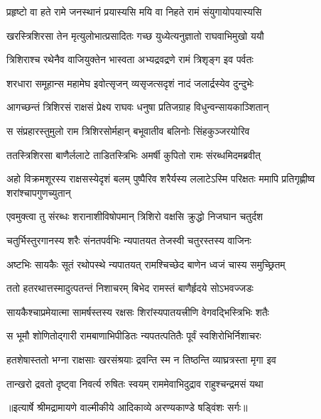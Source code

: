 \twolineshloka
{प्रहृष्टो वा हते रामे जनस्थानं प्रयास्यसि}
{मयि वा निहते रामं संयुगायोपयास्यसि} %

\twolineshloka
{खरस्त्रिशिरसा तेन मृत्युलोभात्प्रसादितः}
{गच्छ युध्येत्यनुज्ञातो राघवाभिमुखो ययौ} %

\twolineshloka
{त्रिशिराश्च रथेनैव वाजियुक्तेन भास्वता}
{अभ्यद्रवद्रणे रामं त्रिशृङ्ग इव पर्वतः} %

\twolineshloka
{शरधारा समूहान्स महामेघ इवोत्सृजन्}
{व्यसृजत्सदृशं नादं जलार्द्रस्येव दुन्दुभेः} %

\twolineshloka
{आगच्छन्तं त्रिशिरसं राक्षसं प्रेक्ष्य राघवः}
{धनुषा प्रतिजग्राह विधुन्वन्सायकाञ्शितान्} %

\twolineshloka
{स संप्रहारस्तुमुलो राम त्रिशिरसोर्महान्}
{बभूवातीव बलिनोः सिंहकुञ्जरयोरिव} %

\twolineshloka
{ततस्त्रिशिरसा बाणैर्ललाटे ताडितस्त्रिभिः}
{अमर्षी कुपितो रामः संरब्धमिदमब्रवीत्} %

\threelineshloka
{अहो विक्रमशूरस्य राक्षसस्येदृशं बलम्}
{पुष्पैरिव शरैर्यस्य ललाटेऽस्मि परिक्षतः}
{ममापि प्रतिगृह्णीष्व शरांश्चापगुणच्युतान्} %

\twolineshloka
{एवमुक्त्वा तु संरब्धः शरानाशीविषोपमान्}
{त्रिशिरो वक्षसि क्रुद्धो निजघान चतुर्दश} %

\twolineshloka
{चतुर्भिस्तुरगानस्य शरैः संनतपर्वभिः}
{न्यपातयत तेजस्वी चतुरस्तस्य वाजिनः} %

\twolineshloka
{अष्टभिः सायकैः सूतं रथोपस्थे न्यपातयत्}
{रामश्चिच्छेद बाणेन ध्वजं चास्य समुच्छ्रितम्} %

\twolineshloka
{ततो हतरथात्तस्मादुत्पतन्तं निशाचरम्}
{बिभेद रामस्तं बाणैर्हृदये सोऽभवज्जडः} %

\twolineshloka
{सायकैश्चाप्रमेयात्मा सामर्षस्तस्य रक्षसः}
{शिरांस्यपातयत्त्रीणि वेगवद्भिस्त्रिभिः शतैः} %

\twolineshloka
{स भूमौ शोणितोद्गारी रामबाणाभिपीडितः}
{न्यपतत्पतितैः पूर्वं स्वशिरोभिर्निशाचरः} %

\twolineshloka
{हतशेषास्ततो भग्ना राक्षसाः खरसंश्रयाः}
{द्रवन्ति स्म न तिष्ठन्ति व्याघ्रत्रस्ता मृगा इव} %

\twolineshloka
{तान्खरो द्रवतो दृष्ट्वा निवर्त्य रुषितः स्वयम्}
{राममेवाभिदुद्राव राहुश्चन्द्रमसं यथा} %


{॥इत्यार्षे श्रीमद्रामायणे वाल्मीकीये आदिकाव्ये अरण्यकाण्डे षड्विंशः सर्गः॥}


